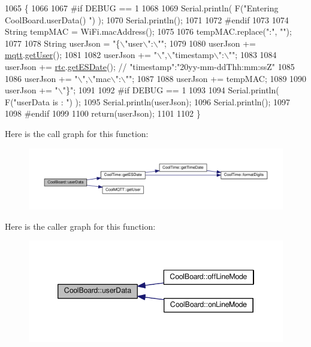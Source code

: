 \begin{DoxyCode}
1065 \{
1066 
1067 \textcolor{preprocessor}{#if DEBUG == 1}
1068 
1069     Serial.println( F(\textcolor{stringliteral}{"Entering CoolBoard.userData() "}) );
1070     Serial.println();
1071 
1072 \textcolor{preprocessor}{#endif}
1073 
1074     String tempMAC = WiFi.macAddress();
1075 
1076     tempMAC.replace(\textcolor{stringliteral}{":"}, \textcolor{stringliteral}{""});
1077 
1078     String userJson = \textcolor{stringliteral}{"\{\(\backslash\)"user\(\backslash\)":\(\backslash\)""};
1079 
1080     userJson += \hyperlink{classCoolBoard_a2399f44d7c23c1149a335cb3b46d90f1}{mqtt}.\hyperlink{classCoolMQTT_a373cc92fca7760d886f02d8a6e5b3f63}{getUser}();
1081 
1082     userJson += \textcolor{stringliteral}{"\(\backslash\)",\(\backslash\)"timestamp\(\backslash\)":\(\backslash\)""};
1083 
1084     userJson += \hyperlink{classCoolBoard_a50d2a6716879d64a85f3c6b44ad63275}{rtc}.\hyperlink{classCoolTime_ac4f32ee513c1328d984306645e8785a4}{getESDate}(); \textcolor{comment}{// "timestamp":"20yy-mm-ddThh:mm:ssZ"}
1085 
1086     userJson += \textcolor{stringliteral}{"\(\backslash\)",\(\backslash\)"mac\(\backslash\)":\(\backslash\)""};
1087 
1088     userJson += tempMAC;
1089 
1090     userJson += \textcolor{stringliteral}{"\(\backslash\)"\}"};
1091 
1092 \textcolor{preprocessor}{#if DEBUG == 1}
1093 
1094     Serial.println( F(\textcolor{stringliteral}{"userData is : "}) );
1095     Serial.println(userJson);
1096     Serial.println();
1097 
1098 \textcolor{preprocessor}{#endif  }
1099     
1100     \textcolor{keywordflow}{return}(userJson);
1101     
1102 \}
\end{DoxyCode}
Here is the call graph for this function\+:
\nopagebreak
\begin{figure}[H]
\begin{center}
\leavevmode
\includegraphics[width=350pt]{classCoolBoard_ae7358fb6e623cfc81b775f5f1734909b_cgraph}
\end{center}
\end{figure}
Here is the caller graph for this function\+:
\nopagebreak
\begin{figure}[H]
\begin{center}
\leavevmode
\includegraphics[width=346pt]{classCoolBoard_ae7358fb6e623cfc81b775f5f1734909b_icgraph}
\end{center}
\end{figure}


